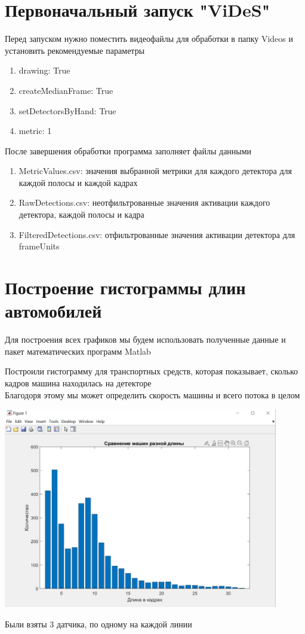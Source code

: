 \documentclass[a4paper,12pt]{article}
\begin{document}
\section*{Первоначальный запуск "ViDeS"}
Перед запуском нужно поместить видеофайлы для обработки в папку Videos
и установить рекомендуемые параметры
\begin{enumerate}
    \item drawing: True
    \item createMedianFrame: True
    \item setDetectorsByHand: True
    \item metric: 1
\end{enumerate}
После завершения обработки программа заполняет файлы данными
\begin{enumerate}
    \item MetricValues.csv: значения выбранной метрики для каждого детектора для каждой полосы и каждой кадрах
    \item RawDetections.csv: неотфильтрованные значения активации каждого детектора, каждой полосы и кадра
    \item FilteredDetections.csv: отфильтрованные значения активации детектора для frameUnits
\end{enumerate}

\newpage
\section*{Построение гистограммы длин автомобилей}
Для построения всех графиков мы будем использовать полученные данные и пакет математических программ Matlab

Построили гистограмму для транспортных средств, которая показывает, сколько кадров машина находилась на детекторе\\
Благодоря этому мы может определить скорость машины и всего потока в целом
\begin{center}
\includegraphics[width=0.9\textwidth]{images/histogram.jpg}
\end{center}
\begin{center}
Были взяты 3 датчика, по одному на каждой линии
\end{center}
\end{document}
